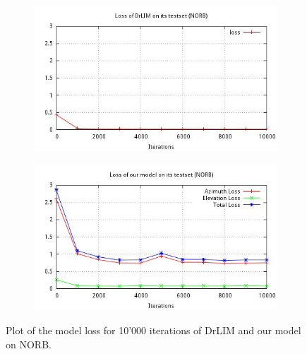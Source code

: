 \documentclass[a4paper,12pt]{report}
\begin{document}
\begin{figure}[h]
    \centering
    \begin{subfigure}{0.45\textwidth}
        \centering
        \includegraphics[width=\textwidth]{thesis_figures/final_loss_testset_3d.jpg}
    \end{subfigure}
    \begin{subfigure}{0.45\textwidth}
        \centering
        \includegraphics[width=\textwidth]{thesis_figures/final_loss_testset_2D1g2.jpg}
    \end{subfigure}
    \caption{Plot of the model loss for 10'000 iterations of DrLIM and our model on NORB.}
    \label{fig:norb_cl2d_loss}
\end{figure}
\end{document}
